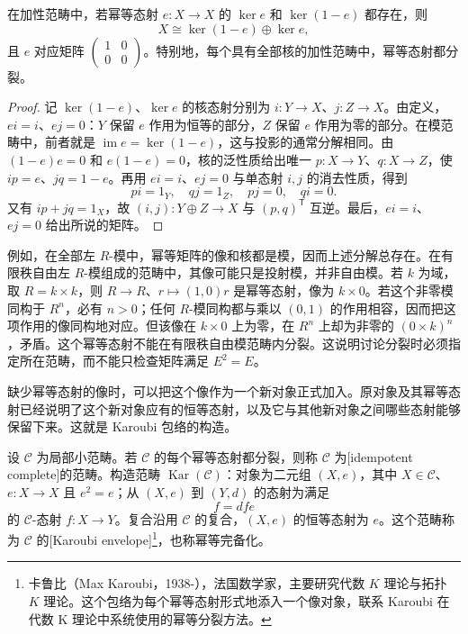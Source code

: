 \begin{proposition}\label{b4:prop:idempotent-kernel-splitting}
	在加性范畴中，若幂等态射 \(e:X\to X\) 的 \(\ker e\) 和 \(\ker(1-e)\) 都存在，则
	\[
		X\cong\ker(1-e)\oplus\ker e,
	\]
	且 \(e\) 对应矩阵 \(\begin{pmatrix}1&0\\0&0\end{pmatrix}\)。特别地，每个具有全部核的加性范畴中，幂等态射都分裂。
\end{proposition}
\begin{proof}
	记 \(\ker(1-e)\)、\(\ker e\) 的核态射分别为 \(i:Y\to X\)、\(j:Z\to X\)。由定义，\(ei=i\)、\(ej=0\)：\(Y\) 保留 \(e\) 作用为恒等的部分，\(Z\) 保留 \(e\) 作用为零的部分。在模范畴中，前者就是 \(\operatorname{im}e=\ker(1-e)\)，这与投影的通常分解相同。由 \((1-e)e=0\) 和 \(e(1-e)=0\)，核的泛性质给出唯一 \(p:X\to Y\)、\(q:X\to Z\)，使 \(ip=e\)、\(jq=1-e\)。再用 \(ei=i\)、\(ej=0\) 与单态射 \(i,j\) 的消去性质，得到
	\[
		pi=1_Y,\quad qj=1_Z,\quad pj=0,\quad qi=0.
	\]
	又有 \(ip+jq=1_X\)，故 \((i,j):Y\oplus Z\to X\) 与 \((p,q)^{\mathsf T}\) 互逆。最后，\(e i=i\)、\(e j=0\) 给出所说的矩阵。
\end{proof}

例如，在全部左 \(R\)-模中，幂等矩阵的像和核都是模，因而上述分解总存在。在有限秩自由左 \(R\)-模组成的范畴中，其像可能只是投射模，并非自由模。若 \(k\) 为域，取 \(R=k\times k\)，则 \(R\to R\)、\(r\mapsto(1,0)r\) 是幂等态射，像为 \(k\times0\)。若这个非零模同构于 \(R^n\)，必有 \(n>0\)；任何 \(R\)-模同构都与乘以 \((0,1)\) 的作用相容，因而把这项作用的像同构地对应。但该像在 \(k\times0\) 上为零，在 \(R^n\) 上却为非零的 \((0\times k)^n\)，矛盾。这个幂等态射不能在有限秩自由模范畴内分裂。这说明讨论分裂时必须指定所在范畴，而不能只检查矩阵满足 \(E^2=E\)。

\ProseParagraphBreak
缺少幂等态射的像时，可以把这个像作为一个新对象正式加入。原对象及其幂等态射已经说明了这个新对象应有的恒等态射，以及它与其他新对象之间哪些态射能够保留下来。这就是 Karoubi 包络的构造。

\begin{definition}\label{b4:def:karoubi-envelope}
	设 \(\mathcal C\) 为局部小范畴。若 \(\mathcal C\) 的每个幂等态射都分裂，则称 \(\mathcal C\) 为[idempotent complete]的范畴。构造范畴 \(\operatorname{Kar}(\mathcal C)\)：对象为二元组 \((X,e)\)，其中 \(X\in\mathcal C\)、\(e:X\to X\) 且 \(e^2=e\)；从 \((X,e)\) 到 \((Y,d)\) 的态射为满足
	\[
		f=dfe
	\]
	的 \(\mathcal C\)-态射 \(f:X\to Y\)。复合沿用 \(\mathcal C\) 的复合，\((X,e)\) 的恒等态射为 \(e\)。这个范畴称为 \(\mathcal C\) 的[Karoubi envelope]\footnote{卡鲁比（Max Karoubi，1938-），法国数学家，主要研究代数 \(K\) 理论与拓扑 \(K\) 理论。这个包络为每个幂等态射形式地添入一个像对象，联系 Karoubi 在代数 K 理论中系统使用的幂等分裂方法。}，也称幂等完备化。
\end{definition}


